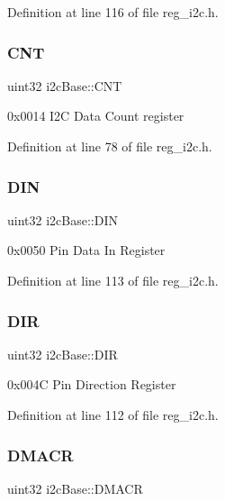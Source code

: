 Definition at line 116 of file reg\+\_\+i2c.\+h.

\mbox{\label{structi2cBase_a4f00b9b1013384dd6814e9447e8cbfe7}} 
\subsubsection{\texorpdfstring{C\+NT}{CNT}}
{\footnotesize\ttfamily uint32 i2c\+Base\+::\+C\+NT}

0x0014 I2C Data Count register 

Definition at line 78 of file reg\+\_\+i2c.\+h.

\mbox{\label{structi2cBase_ae8e8d6e6846b9d8dca96acc4935778e7}} 
\subsubsection{\texorpdfstring{D\+IN}{DIN}}
{\footnotesize\ttfamily uint32 i2c\+Base\+::\+D\+IN}

0x0050 Pin Data In Register 

Definition at line 113 of file reg\+\_\+i2c.\+h.

\mbox{\label{structi2cBase_a2146785f6130deb34e5dc0331f4b7982}} 
\subsubsection{\texorpdfstring{D\+IR}{DIR}}
{\footnotesize\ttfamily uint32 i2c\+Base\+::\+D\+IR}

0x004C Pin Direction Register 

Definition at line 112 of file reg\+\_\+i2c.\+h.

\mbox{\label{structi2cBase_a667ed767356fcea0b80a97a1d49f505f}} 
\subsubsection{\texorpdfstring{D\+M\+A\+CR}{DMACR}}
{\footnotesize\ttfamily uint32 i2c\+Base\+::\+D\+M\+A\+CR}

